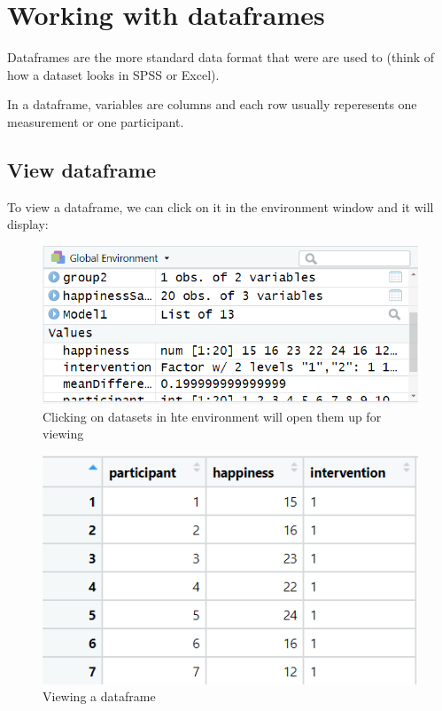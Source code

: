 \documentclass[
]{book}
\begin{document}
\hypertarget{working-with-dataframes}{%
\section{Working with dataframes}\label{working-with-dataframes}}

Dataframes are the more standard data format that were are used to (think of how a dataset looks in SPSS or Excel).

In a dataframe, variables are columns and each row usually reperesents one measurement or one participant.

\hypertarget{view-dataframe}{%
\subsection{View dataframe}\label{view-dataframe}}

To view a dataframe, we can click on it in the environment window and it will display:

\begin{figure}
\centering
\includegraphics{images/environment.png}
\caption{Clicking on datasets in hte environment will open them up for viewing}
\end{figure}

\begin{figure}
\centering
\includegraphics{images/dataframe.png}
\caption{Viewing a dataframe}
\end{figure}
\end{document}
